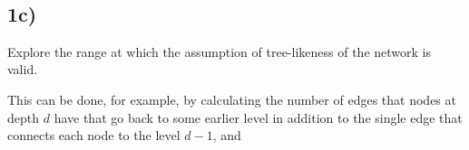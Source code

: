 \documentclass[11pt]{article}
\begin{document}
    \begin{center}
    \end{center}
    { \hspace*{\fill} \\}
    
    \begin{center}
    \end{center}
    { \hspace*{\fill} \\}
    
    \begin{center}
    \end{center}
    { \hspace*{\fill} \\}
    
    \begin{center}
    \end{center}
    { \hspace*{\fill} \\}
    
    \begin{center}
    \end{center}
    { \hspace*{\fill} \\}
    
    \begin{center}
    \end{center}
    { \hspace*{\fill} \\}
    
    \subsection{1c)}\label{c}

Explore the range at which the assumption of tree-likeness of the
network is valid.

This can be done, for example, by calculating the number of edges that
nodes at depth \(d\) have that go back to some earlier level in addition
to the single edge that connects each node to the level \(d − 1\), and
\end{document}
